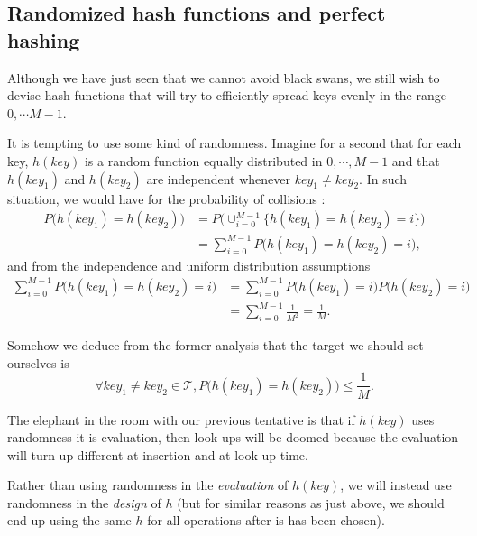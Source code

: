 \documentclass[12pt]{article}
\theoremstyle{plain}
\theoremstyle{remark}
\begin{document}
\subsection{Randomized hash functions and perfect hashing}

Although we have just seen that we cannot avoid black swans, we still wish to
devise hash functions that will try to efficiently spread keys evenly in the range
$0,\cdots M-1$. 

It is tempting to use some kind of randomness. Imagine for a second that
for each key, $h(key)$ is a random function equally distributed in ${0,\cdots,
M-1}$ and that $h(key_1)$ and $h(key_2)$ are independent whenever $key_1
\neq key_2.$ In such situation, we would have for the probability of collisions :
\begin{equation*}\begin{split}
	P\big(h(key_1) = h(key_2)\big) &= P\big(\cup_{i=0}^{M-1} \{h(key_1) = h(key_2) =
	i\}\big)\\
	&= \sum_{i=0}^{M-1} P\big(h(key_1) = h(key_2) = i\big),
\end{split}
\end{equation*}
and from the independence and uniform distribution assumptions
\begin{equation*}\begin{split}
	\sum_{i=0}^{M-1} P\big(h(key_1) = h(key_2) = i\big) &= \sum_{i=0}^{M-1}
	P\big(h(key_1)=i\big)P\big(h(key_2) = i\big)\\
	&= \sum_{i=0}^{M-1} \frac{1}{M^2} = \frac{1}{M}.
\end{split}
\end{equation*}

Somehow we deduce from the former analysis that the target we should set
ourselves is 
\begin{equation}\label{eq:goodhash}
	\forall key_1 \neq key_2 \in \mathcal{T}, P\big( h(key_1) = h(key_2)\big) \leq \frac{1}{M}.
\end{equation}

The elephant in the room with our previous tentative is that if $h(key)$ uses
randomness it is evaluation, then look-ups will be doomed because the evaluation
will turn up different at insertion and at look-up time. 

Rather than using randomness in the {\it evaluation} of $h(key)$, we will instead
use randomness in the {\it design} of $h$ (but for similar reasons as just above, we 
should end up using the same $h$ for all operations after is has been chosen).
\end{document}
